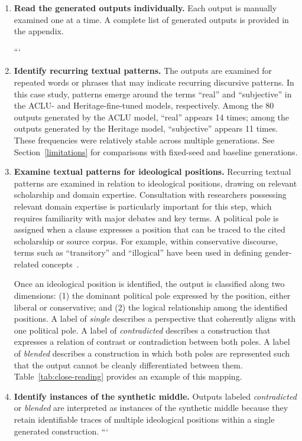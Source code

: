 \documentclass[anonymous,review]{acmart}
\begin{document}
\begin{enumerate}
\item \textbf{Read the generated outputs individually.} Each output is manually examined one at a time. A complete list of generated outputs is provided in the appendix.

```
\item \textbf{Identify recurring textual patterns.} The outputs are examined for repeated words or phrases that may indicate recurring discursive patterns. In this case study, patterns emerge around the terms ``real'' and ``subjective'' in the ACLU- and Heritage-fine-tuned models, respectively. Among the 80 outputs generated by the ACLU model, ``real'' appears 14 times; among the outputs generated by the Heritage model, ``subjective'' appears 11 times. These frequencies were relatively stable across multiple generations. See Section~\ref{limitations} for comparisons with fixed-seed and baseline generations.

\item \textbf{Examine textual patterns for ideological positions.} Recurring textual patterns are examined in relation to ideological positions, drawing on relevant scholarship and domain expertise. Consultation with researchers possessing relevant domain expertise is particularly important for this step, which requires familiarity with major debates and key terms. A political pole is assigned when a clause expresses a position that can be traced to the cited scholarship or source corpus. For example, within conservative discourse, terms such as ``transitory'' and ``illogical'' have been used in defining gender-related concepts~\cite{heritage_2026;amin_2022}.

Once an ideological position is identified, the output is classified along two dimensions: (1) the dominant political pole expressed by the position, either liberal or conservative; and (2) the logical relationship among the identified positions. A label of \emph{single} describes a perspective that coherently aligns with one political pole. A label of \emph{contradicted} describes a construction that expresses a relation of contrast or contradiction between both poles. A label of \emph{blended} describes a construction in which both poles are represented such that the output cannot be cleanly differentiated between them. Table~\ref{tab:close-reading} provides an example of this mapping.

\item \textbf{Identify instances of the synthetic middle.} Outputs labeled \emph{contradicted} or \emph{blended} are interpreted as instances of the synthetic middle because they retain identifiable traces of multiple ideological positions within a single generated construction.
```

\end{enumerate}
\end{document}
